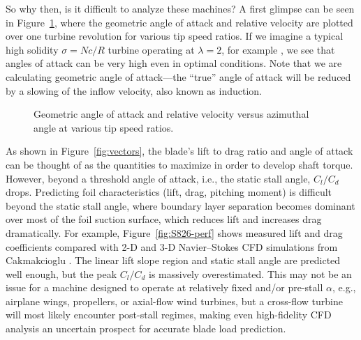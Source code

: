 So why then, is it difficult to analyze these machines? A first glimpse can be
seen in Figure~\ref{fig:geom-alpha-urel}, where the geometric angle of attack
and relative velocity are plotted over one turbine revolution for various tip
speed ratios. If we imagine a typical high solidity $\sigma = Nc/R$ turbine
operating at $\lambda = 2$, for example \cite{Howell2010}, we see that angles of
attack can be very high even in optimal conditions. Note that we are calculating
geometric angle of attack---the ``true'' angle of attack will be reduced by a
slowing of the inflow velocity, also known as induction. 

\begin{figure}[ht]
    \caption{Geometric angle of attack and relative velocity versus azimuthal
        angle at various tip speed ratios.}
    
    \label{fig:geom-alpha-urel}
\end{figure}

As shown in Figure~\ref{fig:vectors}, the blade's lift to drag ratio and angle
of attack can be thought of as the quantities to maximize in order to develop
shaft torque. However, beyond a threshold angle of attack, i.e., the static
stall angle, $C_l/C_d$ drops. Predicting foil characteristics (lift, drag,
pitching moment) is difficult beyond the static stall angle, where boundary
layer separation becomes dominant over most of the foil suction surface, which
reduces lift and increases drag dramatically. For example,
Figure~\ref{fig:S826-perf} shows measured lift and drag coefficients compared
with 2-D and 3-D Navier--Stokes CFD simulations from Cakmakcioglu \etal
\cite{Cakmakcioglu2014}. The linear lift slope region and static stall angle are
predicted well enough, but the peak $C_l/C_d$ is massively overestimated. This
may not be an issue for a machine designed to operate at relatively fixed and/or
pre-stall $\alpha$, e.g., airplane wings, propellers, or axial-flow wind
turbines, but a cross-flow turbine will most likely encounter post-stall
regimes, making even high-fidelity CFD analysis an uncertain prospect for
accurate blade load prediction.


